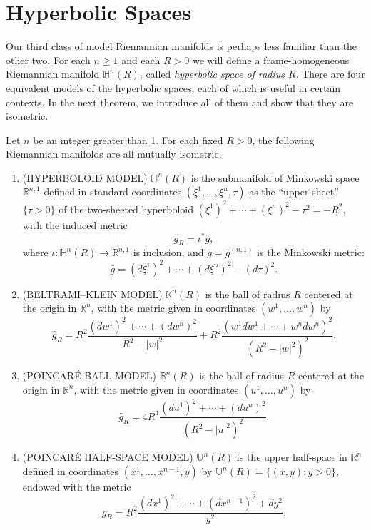 \section{Hyperbolic Spaces}

Our third class of model Riemannian manifolds is perhaps less familiar than the other two. For each $n \geq 1$ and each $R > 0$ we will define a frame-homogeneous Riemannian manifold $\mathbb{H}^n(R)$, called \emph{hyperbolic space of radius $R$}. There are four equivalent models of the hyperbolic spaces, each of which is useful in certain contexts. In the next theorem, we introduce all of them and show that they are isometric.

\begin{theorem}
\label{thm:hyperbolic-space-models}

Let $n$ be an integer greater than 1. For each fixed $R > 0$, the following Riemannian manifolds are all mutually isometric.

\begin{enumerate}
\item[(a)] (HYPERBOLOID MODEL) $\mathbb{H}^n(R)$ is the submanifold of Minkowski space $\mathbb{R}^{n,1}$ defined in standard coordinates $(\xi^1, \ldots, \xi^n, \tau)$ as the ``upper sheet'' $\{\tau > 0\}$ of the two-sheeted hyperboloid $(\xi^1)^2 + \cdots + (\xi^n)^2 - \tau^2 = -R^2$, with the induced metric
\[
\bar{g}_R = \iota^* \bar{g},
\]
where $\iota: \mathbb{H}^n(R) \to \mathbb{R}^{n,1}$ is inclusion, and $\bar{g} = \bar{g}^{(n,1)}$ is the Minkowski metric:
\begin{equation}
\bar{g} = (d\xi^1)^2 + \cdots + (d\xi^n)^2 - (d\tau)^2. \tag{3.8}
\end{equation}

\item[(b)] (BELTRAMI--KLEIN MODEL) $\mathbb{K}^n(R)$ is the ball of radius $R$ centered at the origin in $\mathbb{R}^n$, with the metric given in coordinates $(w^1, \ldots, w^n)$ by
\begin{equation}
\bar{g}_R = R^2 \frac{(dw^1)^2 + \cdots + (dw^n)^2}{R^2 - |w|^2} + R^2 \frac{(w^1 dw^1 + \cdots + w^n dw^n)^2}{(R^2 - |w|^2)^2}. \tag{3.9}
\end{equation}

\item[(c)] (POINCARÉ BALL MODEL) $\mathbb{B}^n(R)$ is the ball of radius $R$ centered at the origin in $\mathbb{R}^n$, with the metric given in coordinates $(u^1, \ldots, u^n)$ by
\[
\bar{g}_R = 4R^4 \frac{(du^1)^2 + \cdots + (du^n)^2}{(R^2 - |u|^2)^2}.
\]

\item[(d)] (POINCARÉ HALF-SPACE MODEL) $\mathbb{U}^n(R)$ is the upper half-space in $\mathbb{R}^n$ defined in coordinates $(x^1, \ldots, x^{n-1}, y)$ by $\mathbb{U}^n(R) = \{(x, y) : y > 0\}$, endowed with the metric
\[
\bar{g}_R = R^2 \frac{(dx^1)^2 + \cdots + (dx^{n-1})^2 + dy^2}{y^2}.
\]
\end{enumerate}

\end{theorem}

